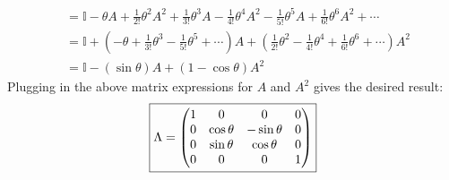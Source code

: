 \documentclass[12pt]{article}
\begin{document}
\begin{enumerate}[label=(\alph*)]
\begin{align*}
        &= \mathbb{I} - \theta A + \frac{1}{2!}\theta^2A^2 + \frac{1}{3!}\theta^3A - \frac{1}{4!}\theta^4A^2 -\frac{1}{5!}\theta^5A + \frac{1}{6!}\theta^6A^2 + \cdots \\
        &= \mathbb{I} + \left(-\theta + \frac{1}{3!}\theta^3 - \frac{1}{5!}\theta^5 + \cdots\right)A + \left(\frac{1}{2!}\theta^2 - \frac{1}{4!}\theta^4 + \frac{1}{6!}\theta^6 + \cdots\right)A^2 \\
        &= \mathbb{I} - (\sin\theta)A + (1-\cos\theta)A^2
    \end{align*}
    Plugging in the above matrix expressions for $A$ and $A^2$ gives the desired result:
    \[ \boxed{\Lambda = \mqty(1&0&0&0\\0&\cos\theta&-\sin\theta&0\\0&\sin\theta&\cos\theta&0\\0&0&0&1)} \]


\end{enumerate}
\end{document}
